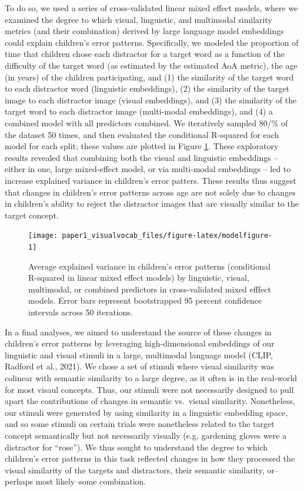 \documentclass[
  man,floatsintext]{apa6}
\begin{document}
To do so, we used a series of cross-validated linear mixed effect models, where we examined the degree to which visual, linguistic, and multimodal similarity metrics (and their combination) derived by large language model embeddings could explain children's error patterns. Specifically, we modeled the proportion of time that children chose each distractor for a target word as a function of the difficulty of the target word (as estimated by the estimated AoA metric), the age (in years) of the children participating, and (1) the similarity of the target word to each distractor word (linguistic embeddings), (2) the similarity of the target image to each distractor image (visual embeddings), and (3) the similarity of the target word to each distractor image (multi-modal embeddings), and (4) a combined model with all predictors combined. We iteratively sampled 80/\% of the dataset 50 times, and then evaluated the conditional R-squared for each model for each split; these values are plotted in Figure \ref{fig:modelfigure}. These exploratory results revealed that combining both the visual and linguistic embeddings -- either in one, large mixed-effect model, or via multi-modal embeddings -- led to increase explained variance in children's error patters. These results thus suggest that changes in children's error patterns across age are not solely due to changes in children's ability to reject the distractor images that are visually similar to the target concept.

\begin{figure}[H]

{\centering \texttt{[image: paper1\_visualvocab\_files/figure-latex/modelfigure-1]} 

}

\caption{Average explained variance in children's error patterns (conditional R-squared in linear mixed effect models) by linguistic, visual, multimodal, or combined predictors in cross-validated mixed efffect models. Error bars represent bootstrapped 95 percent confidence intervals across 50 iterations.}\label{fig:modelfigure}
\end{figure}

In a final analyses, we aimed to understand the source of these changes in children's error patterns by leveraging high-dimensional embeddings of our linguistic and visual stimuli in a large, multimodal language model (CLIP, Radford et al., 2021). We chose a set of stimuli where visual similarity was colinear with semantic similarity to a large degree, as it often is in the real-world for most visaul concepts. Thus, our stimuli were not necessarily designed to pull apart the contributions of changes in semantic vs.~visual similarity. Nonetheless, our stimuli were generated by using similarity in a linguistic embedding space, and so some stimuli on certain trials were nonetheless related to the target concept semantically but not necessarily visually (e.g, gardening gloves were a distractor for ``rose''). We thus sought to understand the degree to which children's error patterns in this task reflected changes in how they processed the visual similarity of the targets and distractors, their semantic similarity, or--perhaps most likely--some combination.
\end{document}

